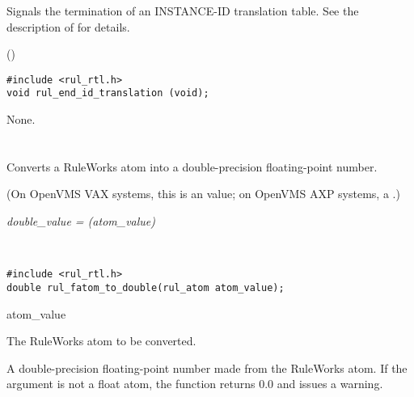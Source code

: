 Signals the termination of an INSTANCE-ID translation table. See the
description of  for details.

\Syntax

()

\CBinding
\begin{verbatim}
#include <rul_rtl.h>
void rul_end_id_translation (void);
\end{verbatim}

\Arguments

None.

\begin{seealso}

\end{seealso}

\section*{}

Converts a RuleWorks  atom into a double-precision floating-point
number.

(On OpenVMS VAX systems, this is an  value; on OpenVMS AXP
systems, a .)

\Syntax

\it{double\_value} = (\it{atom\_value})

\begin{args}
   \\
\end{args}

\CBinding
\begin{verbatim}
#include <rul_rtl.h>
double rul_fatom_to_double(rul_atom atom_value);
\end{verbatim}

\begin{argument}
\item[atom\_value]

  The RuleWorks  atom to be converted.
\end{argument}

\ReturnValue

A double-precision floating-point number made from the RuleWorks atom.
If the argument is not a float atom, the function returns 0.0 and
issues a warning.

\begin{seealso}

\end{seealso}


